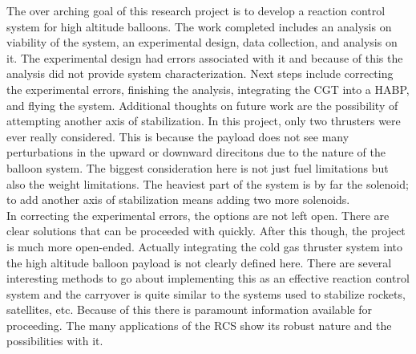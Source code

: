 The over arching goal of this research project is to develop a reaction control system for high altitude balloons. The work completed includes an analysis on viability of the system, an experimental design, data collection, and analysis on it. The experimental design had errors associated with it and because of this the analysis did not provide system characterization. Next steps include correcting the experimental errors, finishing the analysis, integrating the CGT into a HABP, and flying the system. Additional thoughts on future work are the possibility of attempting another axis of stabilization. In this project, only two thrusters were ever really considered. This is because the payload does not see many perturbations in the upward or downward direcitons due to the nature of the balloon system. The biggest consideration here is not just fuel limitations but also the weight limitations. The heaviest part of the system is by far the solenoid; to add another axis of stabilization means adding two more solenoids. \\
In correcting the experimental errors, the options are not left open. There are clear solutions that can be proceeded with quickly. After this though, the project is much more open-ended. Actually integrating the cold gas thruster system into the high altitude balloon payload is not clearly defined here. There are several interesting methods to go about implementing this as an effective reaction control system and the carryover is quite similar to the systems used to stabilize rockets, satellites, etc. Because of this there is paramount information available for proceeding. The many applications of the RCS show its robust nature and the possibilities with it.